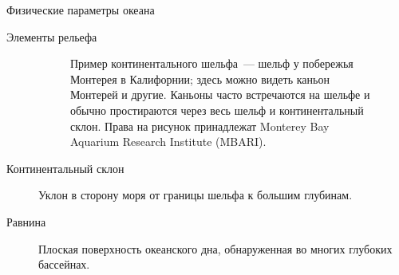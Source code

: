 \begin{chapter}{Физические параметры океана}
\begin{section}{Элементы рельефа}
\begin{description}
\begin{figure}[b!]
\caption{Пример континентального шельфа~--- шельф у побережья Монтерея
в Калифорнии; здесь можно видеть каньон Монтерей и другие. Каньоны
часто встречаются на шельфе и обычно простираются через весь шельф и
континентальный склон. Права на рисунок принадлежат Monterey Bay
Aquarium Research Institute (MBARI).}
\label{fig:canyon}
\end{figure}
%
 
\item[Континентальный склон]
Уклон в сторону моря от границы шельфа к большим глубинам.
%

\item[Равнина]
Плоская поверхность океанского дна, обнаруженная во многих глубоких бассейнах.
%


\end{description}
\end{section}
\end{chapter}
